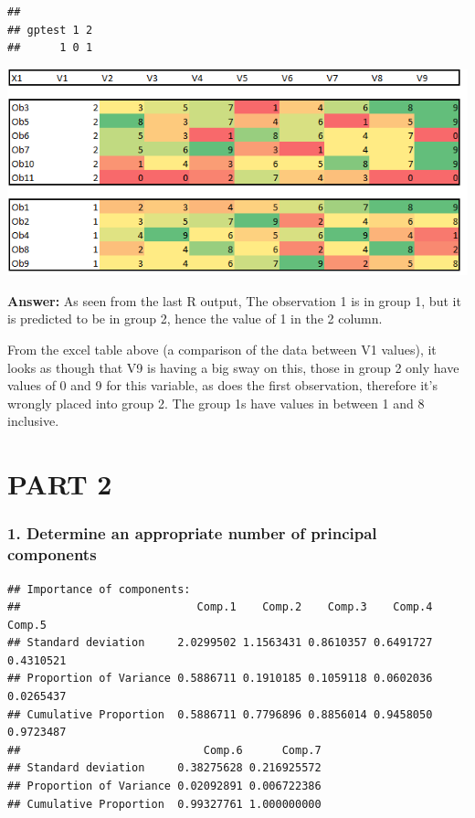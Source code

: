 \documentclass[
  8pt,
]{article}
\begin{document}
\begin{verbatim}
##       
## gptest 1 2
##      1 0 1
\end{verbatim}

\includegraphics{1-6.png}

\textbf{Answer: } As seen from the last R output, The observation 1 is
in group 1, but it is predicted to be in group 2, hence the value of 1
in the 2 column.

From the excel table above (a comparison of the data between V1 values),
it looks as though that V9 is having a big sway on this, those in group
2 only have values of 0 and 9 for this variable, as does the first
observation, therefore it's wrongly placed into group 2. The group 1s
have values in between 1 and 8 inclusive.

\hypertarget{part-2}{%
\section{PART 2}\label{part-2}}

\hypertarget{determine-an-appropriate-number-of-principal-components}{%
\subsubsection{1. Determine an appropriate number of principal
components}\label{determine-an-appropriate-number-of-principal-components}}

\begin{verbatim}
## Importance of components:
##                           Comp.1    Comp.2    Comp.3    Comp.4    Comp.5
## Standard deviation     2.0299502 1.1563431 0.8610357 0.6491727 0.4310521
## Proportion of Variance 0.5886711 0.1910185 0.1059118 0.0602036 0.0265437
## Cumulative Proportion  0.5886711 0.7796896 0.8856014 0.9458050 0.9723487
##                            Comp.6      Comp.7
## Standard deviation     0.38275628 0.216925572
## Proportion of Variance 0.02092891 0.006722386
## Cumulative Proportion  0.99327761 1.000000000
\end{verbatim}
\end{document}
